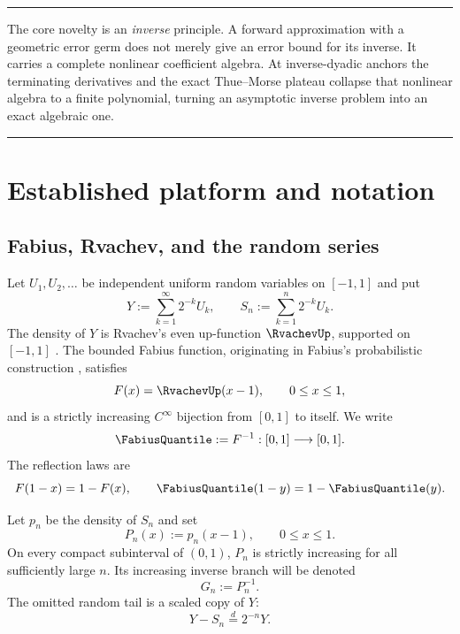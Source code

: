 \documentclass[11pt,oneside]{article}
\numberwithin{equation}{section}
\theoremstyle{definition}
\theoremstyle{remark}
\newcommand{\Fn}{P_n}
\newcommand{\Gn}{G_n}
\newenvironment{boxedremark}{%
  \par\smallskip\noindent\begin{center}\begin{minipage}{0.94\textwidth}%
  \color{black}\hrule\vspace{0.6em}\small
}{%
  \vspace{0.6em}\hrule\end{minipage}\end{center}\smallskip
}
\begin{document}
\begin{boxedremark}
The core novelty is an \emph{inverse} principle.  A forward approximation with a geometric
error germ does not merely give an error bound for its inverse.  It carries a complete
nonlinear coefficient algebra.  At inverse-dyadic anchors the terminating derivatives and
the exact Thue--Morse plateau collapse that nonlinear algebra to a finite polynomial, turning
an asymptotic inverse problem into an exact algebraic one.
\end{boxedremark}

\section{Established platform and notation}
\label{p1:sec:platform}

\subsection{Fabius, Rvachev, and the random series}

Let $U_1,U_2,\ldots$ be independent uniform random variables on $[-1,1]$ and put
\begin{equation}
 Y:=\sum_{k=1}^{\infty}2^{-k}U_k,
 \qquad
 S_n:=\sum_{k=1}^{n}2^{-k}U_k.
 \label{p1:eq:Y-prefix}
\end{equation}
The density of $Y$ is Rvachev's even up-function $\RvachevUp$, supported on $[-1,1]$ \cite{p1:Rvachev1990,p1:Arias1982,p1:ProveItPrimary}.
The bounded Fabius function, originating in Fabius's probabilistic construction \cite{p1:Fabius1966}, satisfies
\begin{equation}
 F(x)=\RvachevUp(x-1),\qquad 0\le x\le1,
 \label{p1:eq:F-up-shift}
\end{equation}
and is a strictly increasing $C^\infty$ bijection from $[0,1]$ to itself.  We write
\begin{equation}
 \FabiusQuantile:=F^{-1}:[0,1]\longrightarrow[0,1].
 \label{p1:eq:G-def}
\end{equation}
The reflection laws are
\begin{equation}
 F(1-x)=1-F(x),\qquad \FabiusQuantile(1-y)=1-\FabiusQuantile(y).
 \label{p1:eq:reflection}
\end{equation}

Let $p_n$ be the density of $S_n$ and set
\begin{equation}
 \Fn(x):=p_n(x-1),\qquad 0\le x\le1.
 \label{p1:eq:Pn-def}
\end{equation}
On every compact subinterval of $(0,1)$, $\Fn$ is strictly increasing for all sufficiently
large $n$.  Its increasing inverse branch will be denoted
\begin{equation}
 \Gn:=\Fn^{-1}.
 \label{p1:eq:Gn-def}
\end{equation}
The omitted random tail is a scaled copy of $Y$:
\begin{equation}
 Y-S_n\stackrel{d}=2^{-n}Y.
 \label{p1:eq:tail-copy}
\end{equation}
\end{document}
